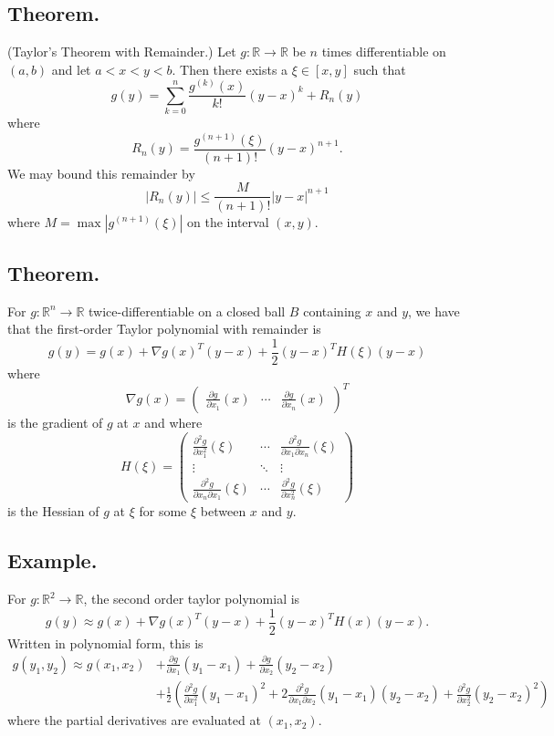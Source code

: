 \documentclass[titlepage]{article}
\begin{document}
\subsection{Theorem.} (Taylor's Theorem with Remainder.) 
Let $g: \mathbb{R} \to \mathbb{R}$ be $n$ times differentiable on $(a, b)$ and let $a < x < y < b$. Then there exists a $\xi \in [x, y]$ such that 
$$g(y) = \sum_{k=0}^{n}\frac{g^{(k)}(x)}{k!}(y-x)^{k} + R_{n}(y)$$
where
$$R_{n}(y) = \frac{g^{(n+1)}(\xi)}{(n+1)!}(y-x)^{n+1}.$$
We may bound this remainder by 
$$|R_{n}(y)| \leq \frac{M}{(n+1)!}|y-x|^{n+1}$$
where $M = \max|g^{(n+1)}(\xi)|$ on the interval $(x, y)$.

\subsection{Theorem.} For $g: \mathbb{R}^{n} \to \mathbb{R}$ twice-differentiable on a closed ball $B$ containing $x$ and $y$, we have that the first-order Taylor polynomial with remainder is 
$$g(y) = g(x) + \nabla g(x)^{T}(y-x) + \frac{1}{2}(y-x)^{T}H(\xi)(y-x)$$
where 
$$\nabla g(x) = \begin{pmatrix} \frac{\partial g}{\partial x_{1}}(x) & \cdots & \frac{\partial g}{\partial x_{n}}(x) \end{pmatrix}^{T}$$
is the gradient of $g$ at $x$ and where 
$$H(\xi) = \begin{pmatrix} \frac{\partial^{2} g}{\partial x_{1}^{2}}(\xi) & \cdots & \frac{\partial^{2} g}{\partial x_{1}\partial x_{n}}(\xi) \\ \vdots & \ddots & \vdots \\ \frac{\partial^{2} g}{\partial x_{n}\partial x_{1}}(\xi) & \cdots & \frac{\partial^{2} g}{\partial x_{n}^{2}}(\xi) \end{pmatrix}$$
is the Hessian of $g$ at $\xi$ for some $\xi$ between $x$ and $y$.

\subsection{Example.} For $g: \mathbb{R}^{2} \to \mathbb{R}$, the second order taylor polynomial is 
$$g(y) \approx g(x) + \nabla g(x)^{T}(y-x) + \frac{1}{2}(y-x)^{T}H(x)(y-x).$$
Written in polynomial form, this is 
\begin{align*}
    g(y_{1}, y_{2}) \approx g(x_{1}, x_{2}) &+ \frac{\partial g}{\partial x_{1}}(y_{1}-x_{1}) + \frac{\partial g}{\partial x_{2}}(y_{2}-x_{2}) \\
                                            &+ \frac{1}{2}\left(\frac{\partial^{2} g}{\partial x_{1}^{2}}(y_{1}-x_{1})^{2} + 2\frac{\partial^{2} g}{\partial x_{1}\partial x_{2}}(y_{1}-x_{1})(y_{2}-x_{2}) + \frac{\partial^{2} g}{\partial x_{2}^{2}}(y_{2}-x_{2})^{2}\right)
\end{align*}
where the partial derivatives are evaluated at $(x_{1}, x_{2})$.
\end{document}
